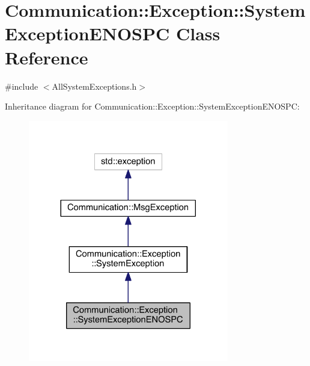 \hypertarget{class_communication_1_1_exception_1_1_system_exception_e_n_o_s_p_c}{}\section{Communication\+:\+:Exception\+:\+:System\+Exception\+E\+N\+O\+S\+P\+C Class Reference}
\label{class_communication_1_1_exception_1_1_system_exception_e_n_o_s_p_c}


{\ttfamily \#include $<$All\+System\+Exceptions.\+h$>$}



Inheritance diagram for Communication\+:\+:Exception\+:\+:System\+Exception\+E\+N\+O\+S\+P\+C\+:\nopagebreak
\begin{figure}[H]
\begin{center}
\leavevmode
\includegraphics[width=248pt]{class_communication_1_1_exception_1_1_system_exception_e_n_o_s_p_c__inherit__graph}
\end{center}
\end{figure}


